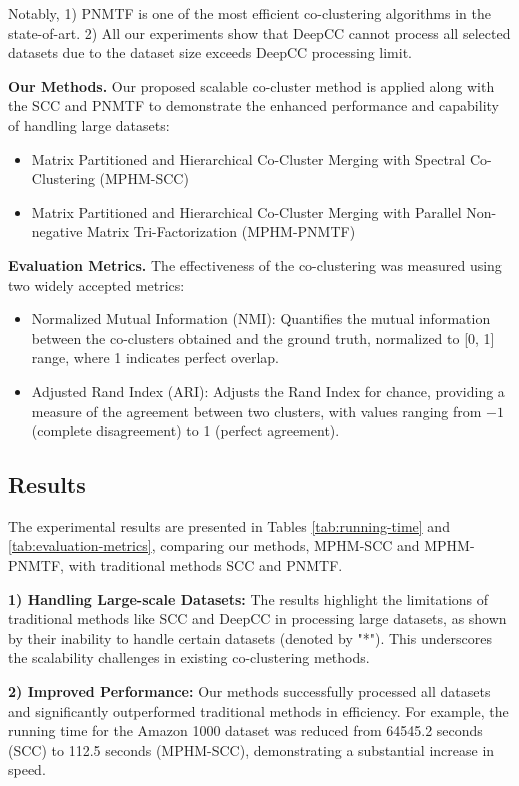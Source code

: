 Notably, 1) PNMTF is one of the most efficient co-clustering algorithms in the state-of-art. 2) All our experiments show that DeepCC cannot process all selected datasets due to the dataset size exceeds DeepCC processing limit.

\textbf{Our Methods.} Our proposed scalable co-cluster method is applied along with the SCC and PNMTF to demonstrate the enhanced performance and capability of handling large datasets:
\begin{itemize}
    \item Matrix Partitioned and Hierarchical Co-Cluster Merging with Spectral Co-Clustering (MPHM-SCC)
    \item Matrix Partitioned and Hierarchical Co-Cluster Merging with Parallel Non-negative Matrix Tri-Factorization (MPHM-PNMTF)
\end{itemize}

\textbf{Evaluation Metrics.}
The effectiveness of the co-clustering was measured using two widely accepted metrics:

\begin{itemize}
    \item Normalized Mutual Information (NMI): Quantifies the mutual information between the co-clusters obtained and the ground truth, normalized to [0, 1] range, where 1 indicates perfect overlap.
    \item Adjusted Rand Index (ARI): Adjusts the Rand Index for chance, providing a measure of the agreement between two clusters, with values ranging from $-1$ (complete disagreement) to 1 (perfect agreement).
\end{itemize}

\subsection{Results}
The experimental results are presented in Tables \ref{tab:running-time} and \ref{tab:evaluation-metrics}, comparing our methods, MPHM-SCC and MPHM-PNMTF, with traditional methods SCC and PNMTF.

\textbf{1) Handling Large-scale Datasets:} The results highlight the limitations of traditional methods like SCC and DeepCC in processing large datasets, as shown by their inability to handle certain datasets (denoted by "*"). This underscores the scalability challenges in existing co-clustering methods.

\textbf{2) Improved Performance:} Our methods successfully processed all datasets and significantly outperformed traditional methods in efficiency. For example, the running time for the Amazon 1000 dataset was reduced from 64545.2 seconds (SCC) to 112.5 seconds (MPHM-SCC), demonstrating a substantial increase in speed.

